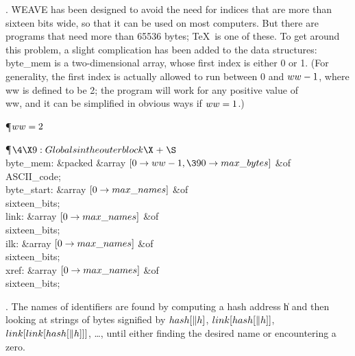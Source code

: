 . \.{WEAVE} has been designed to avoid the need for indices that are more
than sixteen bits wide, so that it can be used on most computers. But
there are programs that need more than 65536 bytes; \TeX\ is one of these.
To get around this problem, a slight complication has been added to the
data structures:  \\{byte\_mem} is a two-dimensional array, whose first index
is either 0 or 1. (For generality, the first index is actually allowed to
run between 0 and $\\{ww}-1$, where \\{ww} is defined to be 2; the program will
work for any positive value of \\{ww}, and it can be simplified in obvious
ways if $\\{ww}=1$.)

\Y\P\D {}$\\{ww}=2$\par
\Y\P$\4\X9:Globals in the outer block\X\mathrel{+}\S$\6
\4\\{byte\_mem}: \&{packed} \&{array} $[0\to\\{ww}-1,\390\to\\{max%
\_bytes}]$ \1\&{of}\5
\\{ASCII\_code};\2\6
\4\\{byte\_start}: \&{array} $[0\to\\{max\_names}]$ \1\&{of}\5
\\{sixteen\_bits};\2\6
\4\\{link}: \&{array} $[0\to\\{max\_names}]$ \1\&{of}\5
\\{sixteen\_bits};\2\6
\4\\{ilk}: \&{array} $[0\to\\{max\_names}]$ \1\&{of}\5
\\{sixteen\_bits};\2\6
\4\\{xref}: \&{array} $[0\to\\{max\_names}]$ \1\&{of}\5
\\{sixteen\_bits};\2\par
\fi

. The names of identifiers are found by computing a hash address \|h and
then looking at strings of bytes signified by $\\{hash}[\|h]$, $\\{link}[%
\\{hash}[\|h]]$,
$\\{link}[\\{link}[\\{hash}[\|h]]]$, \dots, until either finding the desired
name
or encountering a zero.

